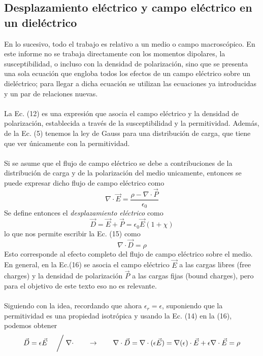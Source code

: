 \documentclass[12pt, notitlepage]{article}
\numberwithin{equation}{section}
\begin{document}
\subsection{Desplazamiento eléctrico y campo eléctrico en un dieléctrico}
En lo sucesivo, todo el trabajo es relativo a un medio o campo macroscópico. En este informe no se trabaja directamente con los momentos dipolares, la susceptibilidad, o incluso con la densidad de polarización, sino que se presenta una sola ecuación que engloba todos los efectos de un campo eléctrico sobre un dieléctrico; para llegar a dicha ecuación se utilizan las ecuaciones ya introducidas y un par de relaciones nuevas.\\\\
La Ec. (12) es una expresión que asocia el campo eléctrico y la densidad de polarización, establecida a través de la susceptibilidad y la permitividad. Además, de la Ec. (5) tenemos la ley de Gauss para una distribución de carga, que tiene que ver únicamente con la permitividad.\\\\
Si se asume que el flujo de campo eléctrico se debe a contribuciones de la distribución de carga y de la polarización del medio unicamente, entonces se puede expresar dicho flujo de campo eléctrico como
\begin{equation}
\nabla\cdot\vec{E} = \frac{\rho - \nabla\cdot\vec{P}}{\epsilon_0}
\end{equation}
Se define entonces el \textit{desplazamiento eléctrico} como
\begin{equation}
\vec{D} = \vec{E} + \vec{P} = \epsilon_0\vec{E}(1 + \chi)
\end{equation}
lo que nos permite escribir la Ec. (15) como
\begin{equation}
\nabla\cdot\vec{D} = \rho
\end{equation}
Esto corresponde al efecto completo del flujo de campo eléctrico sobre el medio. En general, en la Ec.(16) se asocia el campo eléctrico $\vec{E}$ a las cargas libres (free charges) y la densidad de polarización $\vec{P}$ a las cargas fijas (bound charges), pero para el objetivo de este texto eso no es relevante.\\\\
Siguiendo con la idea, recordando que ahora $\epsilon_r = \epsilon$, suponiendo que la permitividad es una propiedad isotrópica y usando la Ec. (14) en la (16), podemos obtener
\begin{equation}
\vec{D} = \epsilon\vec{E}\quad\biggm/\nabla\cdot\qquad\rightarrow\qquad\nabla\cdot\vec{D}=\nabla\cdot(\epsilon\vec{E}) = \nabla(\epsilon)\cdot\vec{E} + \epsilon\nabla\cdot\vec{E} = \rho
\end{equation}
\end{document}
